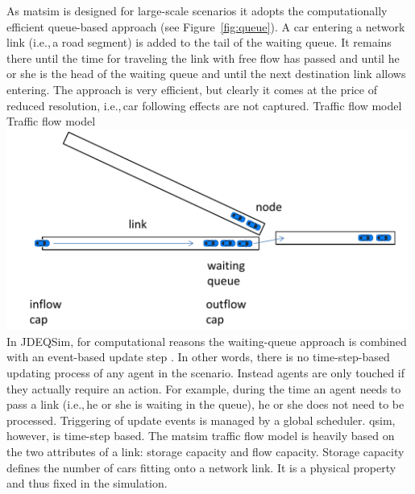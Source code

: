 As \gls{matsim} is designed for large-scale \glspl{scenario} it adopts the computationally efficient queue-based approach (see Figure~\ref{fig:queue}). A car entering a network link (i.e.,\,a road segment) is added to the tail of the waiting queue. It remains there until the time for traveling the link with free flow has passed and until he or she is the head of the waiting queue and until the next destination link allows entering. The approach is very efficient, but clearly it comes at the price of reduced resolution, i.e.,\,car following effects are not captured.   
%
\createfigure%
{Traffic flow model}%
{Traffic flow model}%
{\label{fig:queue}}%
{\includegraphics[width=0.99\textwidth, angle=0]{using/figures/queue.pdf}}%
{}
%
In JDEQSim, for computational reasons the waiting-queue approach is combined with an event-based update step \citep[][]{CharyparEtAl_TRB_2009}. In other words, there is no time-step-based updating process of any agent in the scenario. Instead agents are only touched if they actually require an action. For example, during the time an agent needs to pass a link (i.e.,\,he or she is waiting in the queue), he or she does not need to be processed.  
%
Triggering of update events is managed by a global scheduler. \gls{qsim}, however, is time-step based. 
%
%
%
The \gls{matsim} traffic flow model is heavily based on the two attributes of a link: storage capacity and flow capacity. Storage capacity defines the number of cars fitting onto a network link. It is a physical property and thus fixed in the simulation. 

